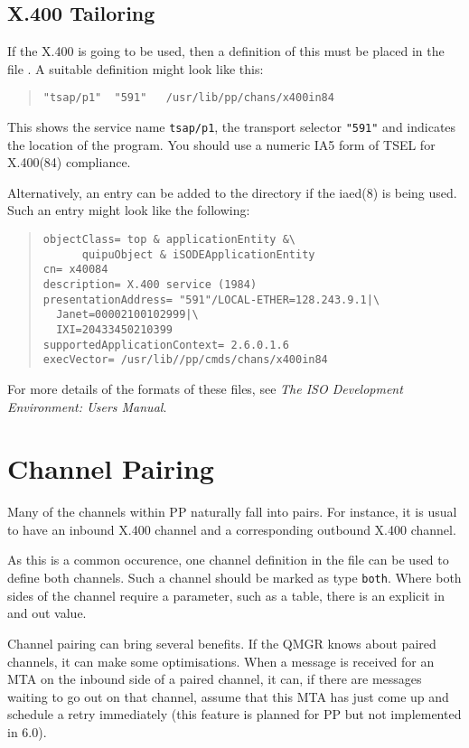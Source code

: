 \subsection{X.400 Tailoring}
If the X.400 is going to be used, then a definition of this must be
placed in the file . A suitable definition
might look like this:
\begin{quote}\small\begin{verbatim}
"tsap/p1"  "591"   /usr/lib/pp/chans/x400in84
\end{verbatim}\end{quote}

This shows the service name \verb|tsap/p1|, the transport selector
\verb+"591"+ and indicates the location of the program. You should use
a numeric IA5 form of TSEL for X.400(84) compliance.

Alternatively, an entry can be added to the directory if the 
\man iaed(8) is being used. Such an entry might look like the
following:
\begin{quote}\small\begin{verbatim}
objectClass= top & applicationEntity &\
      quipuObject & iSODEApplicationEntity
cn= x40084
description= X.400 service (1984)
presentationAddress= "591"/LOCAL-ETHER=128.243.9.1|\
  Janet=00002100102999|\
  IXI=20433450210399
supportedApplicationContext= 2.6.0.1.6
execVector= /usr/lib//pp/cmds/chans/x400in84
\end{verbatim}\end{quote}

For more details of the formats of these files, see {\em The ISO
Development Environment: Users Manual}.

\section{Channel Pairing}\label{channel:pair}

Many of the channels within PP naturally fall into pairs. For
instance, it is usual to have an inbound X.400 channel and a
corresponding outbound X.400 channel.

As this is a common occurence, one channel definition in the 
file can be used to define both channels. Such a channel should be
marked as type \verb|both|. Where both sides of the channel require a
parameter, such as a table, there is an explicit in and out value.

Channel pairing can bring several benefits. If the QMGR knows about
paired channels, it can make some optimisations. When a message is
received for an MTA on the inbound side of a paired channel, it can,
if there are messages waiting to go out on that channel, assume that this
MTA has just come up and schedule a retry immediately (this feature is
planned for PP but not implemented in 6.0).


